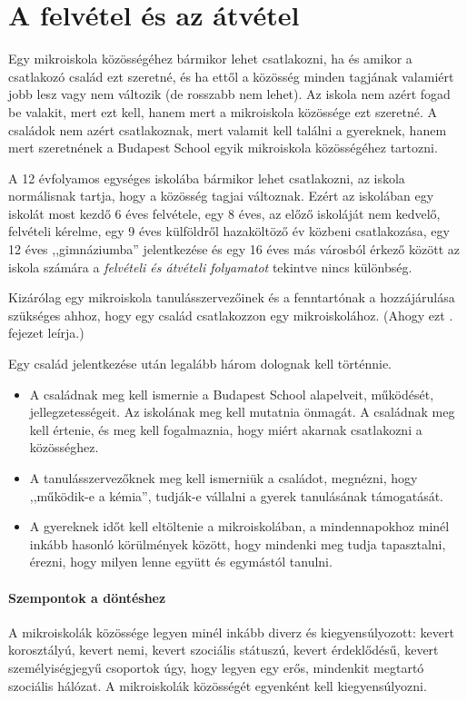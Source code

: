 \section{A felvétel és az átvétel}
\label{sec:felvetel-atvetel}
Egy mikroiskola közösségéhez bármikor lehet csatlakozni, ha és amikor a
csatlakozó
család ezt szeretné, és ha ettől a közösség minden tagjának valamiért  jobb
lesz vagy nem változik (de rosszabb nem lehet).
Az iskola nem azért fogad be valakit, mert
ezt kell, hanem mert a mikroiskola közössége ezt szeretné.
A családok nem azért csatlakoznak, mert valamit kell találni a gyereknek, hanem
mert
szeretnének a Budapest School egyik mikroiskola közösségéhez tartozni.

A 12 évfolyamos egységes iskolába bármikor lehet csatlakozni, az iskola
normálisnak tartja, hogy a közösség tagjai változnak.
Ezért az iskolában egy iskolát most kezdő 6 éves felvétele, egy 8 éves, az előző
iskoláját nem kedvelő, felvételi kérelme, egy 9 éves
külföldről hazaköltöző év közbeni csatlakozása, egy 12 éves ,,gimnáziumba''
jelentkezése és egy 16 éves más városból érkező  között az iskola
számára
a \emph{felvételi és átvételi folyamatot} tekintve nincs különbség.

Kizárólag egy mikroiskola tanulásszervezőinek és a fenntartónak a hozzájárulása
szükséges ahhoz, hogy
egy család csatlakozzon egy mikroiskolához. (Ahogy ezt
. fejezet leírja.)

Egy család jelentkezése után legalább három dolognak kell történnie.
\begin{itemize}
      \item A családnak meg kell ismernie a Budapest School alapelveit,
            működését, jellegzetességeit. Az iskolának meg kell mutatnia
            önmagát. A
            családnak meg kell értenie,  és meg kell fogalmaznia, hogy miért
            akarnak
            csatlakozni a közösséghez.
      \item A tanulásszervezőknek meg kell ismerniük a családot, megnézni, hogy
            ,,működik-e a kémia'', tudják-e vállalni a gyerek tanulásának
            támogatását.
      \item A gyereknek időt kell eltöltenie a mikroiskolában, a mindennapokhoz
            minél inkább hasonló körülmények között, hogy mindenki meg tudja
            tapasztalni,
            érezni, hogy milyen lenne együtt és egymástól tanulni.
\end{itemize}

\paragraph{Szempontok a döntéshez}
A mikroiskolák közössége legyen minél inkább diverz és kiegyensúlyozott: kevert
korosztályú, kevert nemi, kevert szociális státuszú, kevert
érdeklődésű, kevert személyiségjegyű csoportok úgy, hogy legyen egy erős,
mindenkit megtartó szociális
hálózat. A mikroiskolák közösségét egyenként kell kiegyensúlyozni.\eject

